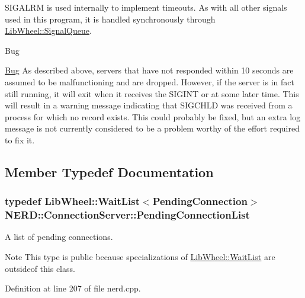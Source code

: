 \-S\-I\-G\-A\-L\-R\-M is used internally to implement timeouts. \-As with all other signals used in this program, it is handled synchronously through \hyperlink{classLibWheel_1_1SignalQueue}{\-Lib\-Wheel\-::\-Signal\-Queue}.

\begin{DoxyRefDesc}{\-Bug}
\item[\hyperlink{bug__bug000002}{\-Bug}]\-As described above, servers that have not responded within 10 seconds are assumed to be malfunctioning and are dropped. \-However, if the server is in fact still running, it will exit when it receives the \-S\-I\-G\-I\-N\-T or at some later time. \-This will result in a warning message indicating that \-S\-I\-G\-C\-H\-L\-D was received from a process for which no record exists. \-This could probably be fixed, but an extra log message is not currently considered to be a problem worthy of the effort required to fix it. \end{DoxyRefDesc}


\subsection{\-Member \-Typedef \-Documentation}
\hypertarget{classNERD_1_1ConnectionServer_ac838d247f33cef856ae722343a8cb7ff}{
\subsubsection[{\-Pending\-Connection\-List}]{\setlength{\rightskip}{0pt plus 5cm}typedef {\bf \-Lib\-Wheel\-::\-Wait\-List}$<${\bf \-Pending\-Connection}$>$ {\bf \-N\-E\-R\-D\-::\-Connection\-Server\-::\-Pending\-Connection\-List}}}
\label{classNERD_1_1ConnectionServer_ac838d247f33cef856ae722343a8cb7ff}


\-A list of pending connections. 

\begin{DoxyNote}{\-Note}
\-This type is public because specializations of \hyperlink{classLibWheel_1_1WaitList}{\-Lib\-Wheel\-::\-Wait\-List} are outsideof this class. 
\end{DoxyNote}


\-Definition at line 207 of file nerd.\-cpp.


